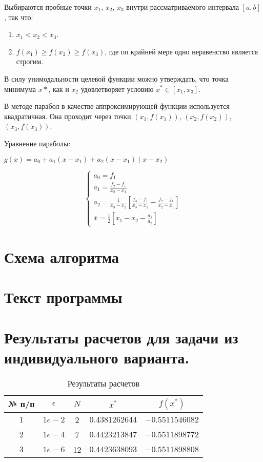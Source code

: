 Выбираются пробные точки $x_1$, $x_2$, $x_3$ внутри рассматриваемого интервала $[a, b]$, так что:
\begin{enumerate}
\item $x_1 < x_2 < x_3$.
\item $f(x_1) \ge f(x_2) \ge f(x_3)$, где по крайней мере одно неравенство является строгим.
\end{enumerate}

В силу унимодальности целевой функции можно утверждать, что точка минимума $x*$, как и $x_2$ удовлетворяет условию $x^* \in [x_1, x_3]$.

В методе парабол в качестве аппроксимирующей функции используется квадратичная. Она проходит через точки $(x_1, f(x_1))$, $(x_2, f(x_2))$, $(x_3, f(x_3))$.

Уравнение параболы:

$g(x) = a_0 + a_1(x - x_1) + a_2(x - x_1)(x - x_2)$

\begin{equation*}
\begin{cases}
a_0 = f_1 \\
a_1 = \frac{f_2 - f_1}{x_2 - x_1} \\
a_2 = \frac{1}{x_3 - x_2}[\frac{f_3 - f_1}{x_3 - x_1} - \frac{f_2 - f_1}{x_2 - x_1}] \\
\overline{x} = \frac{1}{2}[x_1 - x_2 - \frac{a_1}{a_2}]
\end{cases}
\end{equation*}

\newpage

\section{Схема алгоритма}


\section{Текст программы}


\section{Результаты расчетов для задачи из индивидуального варианта.}

\begin{table}[h]
    \centering
    \small
    \caption{Результаты расчетов }
    \label{tbl:cmp}

    \begin{tabular}{|c|c|c|c|c|}
        \hline
        № п/п & $\epsilon$ & $N$ & $x^*$ & $f(x^*)$ \\\hline
        $1$ & $1e-2$ & 2 & $0.4381262644$ & $-0.5511546082$ \\\hline
        $2$ & $1e-4$ & 7 & $0.4423213847$ & $-0.5511898772$ \\\hline
        $3$ & $1e-6$ & 12 & $0.4423638093$ & $-0.5511898808$ \\\hline
    \end{tabular}
\end{table}